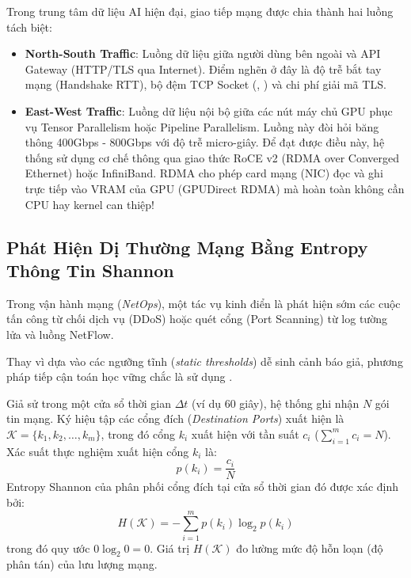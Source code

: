 Trong trung tâm dữ liệu AI hiện đại, giao tiếp mạng được chia thành hai luồng tách biệt:
\begin{itemize}
  \item \textbf{North-South Traffic}: Luồng dữ liệu giữa người dùng bên ngoài và API Gateway (HTTP/TLS qua Internet). Điểm nghẽn ở đây là độ trễ bắt tay mạng (Handshake RTT), bộ đệm TCP Socket (, ) và chi phí giải mã TLS.
  \item \textbf{East-West Traffic}: Luồng dữ liệu nội bộ giữa các nút máy chủ GPU phục vụ Tensor Parallelism hoặc Pipeline Parallelism. Luồng này đòi hỏi băng thông 400Gbps - 800Gbps với độ trễ micro-giây. Để đạt được điều này, hệ thống sử dụng cơ chế  thông qua giao thức RoCE v2 (RDMA over Converged Ethernet) hoặc InfiniBand. RDMA cho phép card mạng (NIC) đọc và ghi trực tiếp vào VRAM của GPU (GPUDirect RDMA) mà hoàn toàn không cần CPU hay kernel can thiệp!
\end{itemize}

\subsection{Phát Hiện Dị Thường Mạng Bằng Entropy Thông Tin Shannon}
Trong vận hành mạng (\textit{NetOps}), một tác vụ kinh điển là phát hiện sớm các cuộc tấn công từ chối dịch vụ (DDoS) hoặc quét cổng (Port Scanning) từ log tường lửa và luồng NetFlow.

Thay vì dựa vào các ngưỡng tĩnh (\textit{static thresholds}) dễ sinh cảnh báo giả, phương pháp tiếp cận toán học vững chắc là sử dụng .

\begin{definition}
Giả sử trong một cửa sổ thời gian $\Delta t$ (ví dụ 60 giây), hệ thống ghi nhận $N$ gói tin mạng. Ký hiệu tập các cổng đích (\textit{Destination Ports}) xuất hiện là $\mathcal{K} = \{k_1, k_2, \dots, k_m\}$, trong đó cổng $k_i$ xuất hiện với tần suất $c_i$ ($\sum_{i=1}^m c_i = N$).
Xác suất thực nghiệm xuất hiện cổng $k_i$ là:
\begin{equation}
p(k_i) = \frac{c_i}{N}
\end{equation}
Entropy Shannon của phân phối cổng đích tại cửa sổ thời gian đó được xác định bởi:
\begin{equation}
H(\mathcal{K}) = - \sum_{i=1}^m p(k_i) \log_2 p(k_i)
\end{equation}
trong đó quy ước $0 \log_2 0 = 0$. Giá trị $H(\mathcal{K})$ đo lường mức độ hỗn loạn (độ phân tán) của lưu lượng mạng.
\end{definition}

